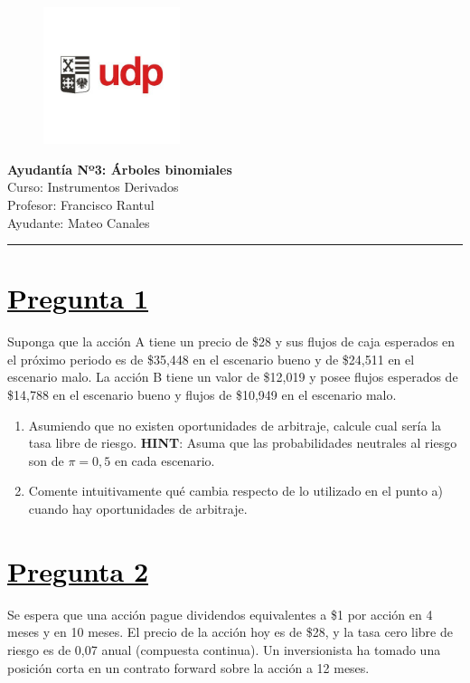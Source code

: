 \documentclass[12pt]{article}
\newcommand{\subrayadoRojo}[1]{{\color{rojoudp}\underline{\textcolor{black}{#1}}}}
\begin{document}
\begin{figure}
    \vspace{-5em}    
    \flushright
    \includegraphics[height=4cm]{../imagenes/logo.png}\\[-3em]
\end{figure}
\begin{center}
    {\LARGE \textbf{Ayudantía Nº3: Árboles binomiales}}\\[0.5em]
    Curso: Instrumentos Derivados\\
    Profesor: Francisco Rantul\\
    Ayudante: Mateo Canales\\
\end{center}
\vspace{1pt}
{\color{rojoudp}\hrule height 2pt}
\vspace{10pt}

\section*{\subrayadoRojo{Pregunta 1}}
Suponga que la acción A tiene un precio de \$28 y sus flujos de caja esperados en el próximo periodo 
es de \$35,448 en el escenario bueno y de \$24,511 en el escenario malo. La acción B tiene un valor de 
\$12,019 y posee flujos esperados de \$14,788 en el escenario bueno y flujos de \$10,949 en el escenario malo. 

\begin{enumerate}[label=\textbf{\alph*)}]
\item   Asumiendo que no existen oportunidades de arbitraje, calcule cual sería la tasa libre de riesgo.
\textbf{HINT}: Asuma que las probabilidades neutrales al riesgo son de $\pi=0,5$ en cada escenario. 

\item   Comente intuitivamente qué cambia respecto de lo utilizado en el punto a) cuando hay oportunidades de arbitraje. 

\end{enumerate}

\section*{\subrayadoRojo{Pregunta 2}}
Se espera que una acción pague dividendos equivalentes a \$1 por acción en 4 meses y en 10 meses.
El precio de la acción hoy es de \$28, y la tasa cero libre de riesgo es de 0,07 anual (compuesta continua).
Un inversionista ha tomado una posición corta en un contrato forward sobre la acción a 12 meses.
\end{document}
